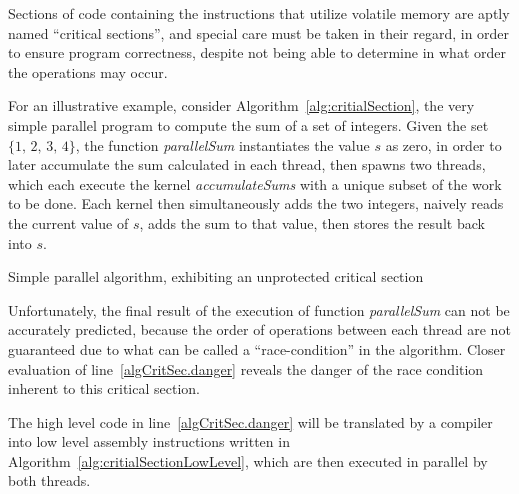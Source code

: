 Sections of code containing the instructions that utilize volatile memory are aptly named ``critical sections'', and special care must be taken in their regard, in order to ensure program correctness, despite not being able to determine in what order the operations may occur.

For an illustrative example, consider Algorithm~\ref{alg:critialSection}, the very simple parallel program to compute the sum of a set of integers. Given the set $\{1,\,2,\,3,\,4\}$, the function \textit{parallelSum} instantiates the value $s$ as zero, in order to later accumulate the sum calculated in each thread, then spawns two threads, which each execute the kernel \textit{accumulateSums} with a unique subset of the work to be done. Each kernel then simultaneously adds the two integers, naively reads the current value of $s$, adds the sum to that value, then stores the result back into $s$.

\begin{algorithm}[ht]
	\DontPrintSemicolon


	\bigskip
\nl	{}

	\bigskip
\nl	{}
	\caption{Simple parallel algorithm, exhibiting an unprotected critical section \label{alg:critialSection}}
\end{algorithm}%

Unfortunately, the final result of the execution of function \textit{parallelSum} can not be accurately predicted, because the order of operations between each thread are not guaranteed due to what can be called a ``race-condition'' in the algorithm. Closer evaluation of line~\ref{algCritSec.danger} reveals the danger of the race condition inherent to this critical section.

The high level code in line~\ref{algCritSec.danger} will be translated by a compiler into low level assembly instructions written in Algorithm~\ref{alg:critialSectionLowLevel}, which are then executed in parallel by both threads.

